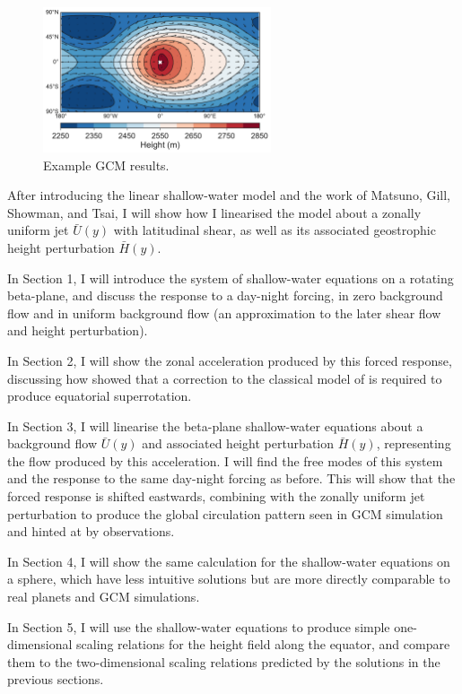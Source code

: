 \begin{figure}
  \centering
  \includegraphics[width=0.6\textwidth]{figures/wave-mean-flow/example-gcm-results.pdf}
  \caption{Example GCM results.}
  \label{fig:example-gcm-results}
\end{figure}

After introducing the linear shallow-water model and the work of Matsuno, Gill, Showman, and Tsai, I will show how I linearised the model about a zonally uniform jet $\bar{U}(y)$ with latitudinal shear, as well as its associated geostrophic height perturbation $\bar{H}(y)$.

In Section 1, I will introduce the system of shallow-water equations on a rotating beta-plane, and discuss the response to a day-night forcing, in zero background flow and in uniform background flow (an approximation to the later shear flow and height perturbation).

In Section 2, I will show the zonal acceleration produced by this forced response, discussing how \citet{showman2010superrotation} showed that a correction to the classical model of \citet{matsuno1966quasi} is required to produce equatorial superrotation.

In Section 3, I will linearise the beta-plane shallow-water equations about a background flow $\bar{U}(y)$ and associated height perturbation $\bar{H}(y)$, representing the flow produced by this acceleration. I will find the free modes of this system and the response to the same day-night forcing as before. This will show that the forced response is shifted eastwards, combining with the zonally uniform jet perturbation to produce the global circulation pattern seen in GCM simulation and hinted at by observations.

In Section 4, I will show the same calculation for the shallow-water equations on a sphere, which have less intuitive solutions but are more directly comparable to real planets and GCM simulations.

In Section 5, I will use the shallow-water equations to produce simple one-dimensional scaling relations for the height field along the equator, and compare them to the two-dimensional scaling relations predicted by the solutions in the previous sections.

